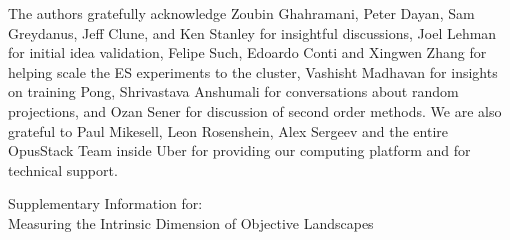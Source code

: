 \documentclass{article} %
\newcommand{\titl}{Measuring the Intrinsic Dimension of Objective Landscapes}
\begin{document}
The authors gratefully acknowledge Zoubin Ghahramani, Peter Dayan, Sam Greydanus, Jeff Clune, and Ken Stanley for insightful discussions, 
Joel Lehman for initial idea validation,
Felipe Such, Edoardo Conti and Xingwen Zhang for helping scale the ES experiments to the cluster,
Vashisht Madhavan for insights on training Pong,
Shrivastava Anshumali for conversations about random projections, and
Ozan Sener for discussion of second order methods. 
We are also grateful to Paul Mikesell, Leon Rosenshein, Alex Sergeev and the entire OpusStack Team inside Uber for providing our computing platform and for technical support.









%
%


\clearpage

\renewcommand{\thesection}{S\arabic{section}}
\renewcommand{\thesubsection}{\thesection.\arabic{subsection}}

\newcommand{\beginsupplementary}{%
	\renewcommand{\thetable}{S\arabic{table}}%
	\renewcommand{\thefigure}{S\arabic{figure}}%
}

\beginsupplementary

%
\noindent\makebox[\linewidth]{\rule{\linewidth}{3.5pt}}
\begin{center}
	{\LARGE\sc  Supplementary Information for:\\ \titl\par}
\end{center}
\end{document}
